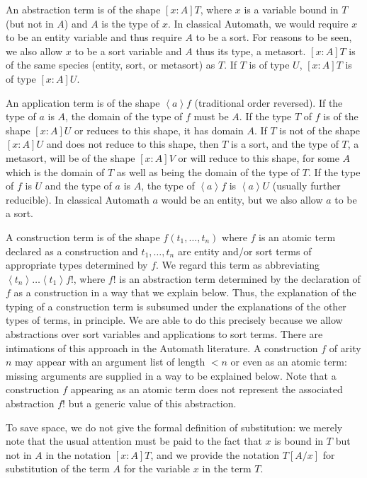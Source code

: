 \documentclass{article}
\begin{document}
An abstraction term is of the shape $[x:A]T$, where $x$ is a variable bound in $T$ (but not in $A$) and $A$ is the type of $x$.  In classical Automath, we would require $x$ to be an entity variable and thus require $A$ to be a sort.  For reasons to be seen, we also allow $x$ to be a sort variable and $A$ thus its type, a metasort.  $[x:A]T$ is of the same species (entity, sort, or metasort) as $T$.  If $T$ is of type $U$,
$[x:A]T$ is of type $[x:A]U$.

An application term is of the shape $\left<a\right>f$ (traditional order reversed).  If the type of $a$ is $A$, the domain of the type of $f$ must be $A$.  If the type $T$ of $f$  is of the shape $[x:A]U$ or reduces to this shape, it has domain $A$.  If $T$ is not of the shape $[x:A]U$ and does not reduce to this shape, then $T$ is a sort, and the type of $T$, a metasort, will be of the shape $[x:A]V$ or will reduce to this shape, for some $A$ which is the domain of $T$ as well as being the domain of the type of $T$.  If the type of $f$ is $U$ and the type of $a$ is $A$, the type of $\left<a\right>f$ is $\left<a\right>U$ (usually further reducible).  In classical Automath $a$ would be an entity, but we also  allow $a$ to be a sort.

A construction term is of the shape $f(t_1,\ldots,t_n)$ where $f$ is an atomic term declared as a construction and $t_1,\ldots,t_n$ are entity and/or sort terms of appropriate types determined by $f$.  We regard this term as abbreviating $\left<t_n\right>\ldots\left<t_1\right>f!$, where $f!$ is an abstraction term determined by the declaration of $f$ as a construction in a way that we explain below.  Thus, the explanation of the typing of a construction term is subsumed under the explanations of the other types of terms, in principle.  We are able to do this precisely because we allow abstractions over sort variables and applications to sort terms.  There are intimations of this approach in the Automath literature.  A construction $f$ of arity $n$ may appear with an argument list of length $<n$ or even as an atomic term:  missing arguments are supplied in a way to be explained below.  Note that a construction $f$ appearing as an atomic term does not represent the associated abstraction $f!$ but a generic value of this abstraction.

To save space, we do not give the formal definition of substitution:  we merely note that the usual attention must be paid to the fact that $x$ is bound in $T$ but not in $A$ in the notation $[x:A]T$, and we provide the notation $T[A/x]$ for substitution of the term $A$ for the variable $x$ in the term $T$.
\end{document}
